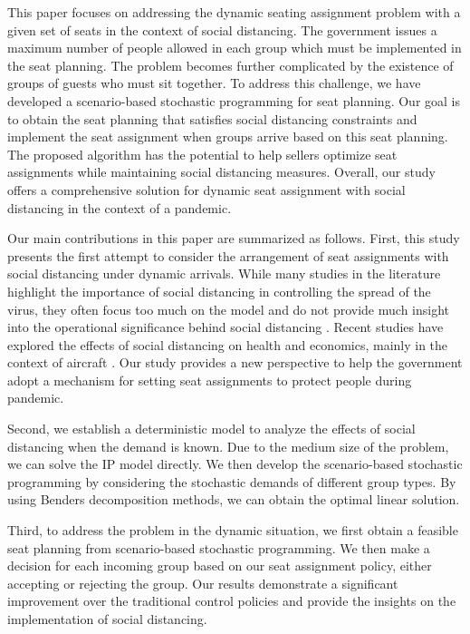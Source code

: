 
This paper focuses on addressing the dynamic seating assignment problem with a given set of seats in the context of social distancing. The government issues a maximum number of people allowed in each group which must be implemented in the seat planning. The problem becomes further complicated by the existence of groups of guests who must sit together. To address this challenge, we have developed a scenario-based stochastic programming for seat planning. Our goal is to obtain the seat planning that satisfies social distancing constraints and implement the seat assignment when groups arrive based on this seat planning. The proposed algorithm has the potential to help sellers optimize seat assignments while maintaining social distancing measures. Overall, our study offers a comprehensive solution for dynamic seat assignment with social distancing in the context of a pandemic.


Our main contributions in this paper are summarized as follows. First, this study presents the first attempt to consider the arrangement of seat assignments with social distancing under dynamic arrivals. While many studies in the literature highlight the importance of social distancing in controlling the spread of the virus, they often focus too much on the model and do not provide much insight into the operational significance behind social distancing \cite{barry2021optimal, fischetti2021safe}. Recent studies have explored the effects of social distancing on health and economics, mainly in the context of aircraft \cite{salari2020social, ghorbani2020model, salari2022social}. Our study provides a new perspective to help the government adopt a mechanism for setting seat assignments to protect people during pandemic.

Second, we establish a deterministic model to analyze the effects of social distancing when the demand is known. Due to the medium size of the problem, we can solve the IP model directly. We then develop the scenario-based stochastic programming by considering the stochastic demands of different group types. By using Benders decomposition methods, we can obtain the optimal linear solution. 

Third, to address the problem in the dynamic situation, we first obtain a feasible seat planning from scenario-based stochastic programming. We then make a decision for each incoming group based on our seat assignment policy, either accepting or rejecting the group. Our results demonstrate a significant improvement over the traditional control policies and provide the insights on the implementation of social distancing.

